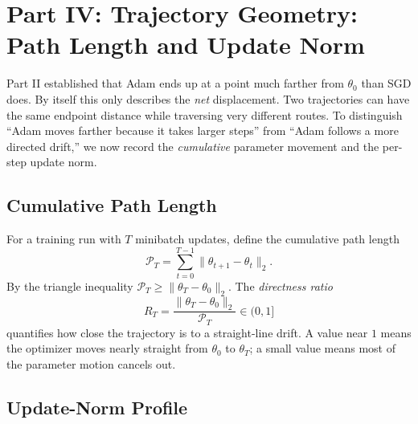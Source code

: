 
\section{Part IV: Trajectory Geometry: Path Length and Update Norm}
\label{sec:path-length}

Part II established that Adam ends up at a point much farther from $\theta_0$ than SGD does. By itself this only describes the \emph{net} displacement. Two trajectories can have the same endpoint distance while traversing very different routes. To distinguish ``Adam moves farther because it takes larger steps'' from ``Adam follows a more directed drift,'' we now record the \emph{cumulative} parameter movement and the per-step update norm.

\subsection{Cumulative Path Length}

For a training run with $T$ minibatch updates, define the cumulative path length
\[
\mathcal{P}_T
= \sum_{t=0}^{T-1}\|\theta_{t+1}-\theta_t\|_2.
\]
By the triangle inequality $\mathcal{P}_T \ge \|\theta_T-\theta_0\|_2$. The \emph{directness ratio}
\[
R_T = \frac{\|\theta_T-\theta_0\|_2}{\mathcal{P}_T}\in (0,1]
\]
quantifies how close the trajectory is to a straight-line drift. A value near $1$ means the optimizer moves nearly straight from $\theta_0$ to $\theta_T$; a small value means most of the parameter motion cancels out.

\subsection{Update-Norm Profile}

